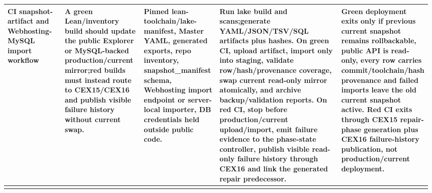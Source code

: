 \begin{longtable}{L{0.14\linewidth} L{0.19\linewidth} L{0.18\linewidth} L{0.31\linewidth} L{0.16\linewidth}}
\hline
\addlinespace[0.24em]
CI snapshot-artifact and Webhosting-MySQL import workflow & A green Lean/\allowbreak{}inventory build should update the public Explorer or MySQL-backed production/\allowbreak{}current mirror;\newline red builds must instead route to CEX15/\allowbreak{}CEX16 and publish visible failure history without current swap. & Pinned lean-toolchain/\allowbreak{}lake-manifest, Master YAML, generated exports, repo inventory, snapshot\_manifest schema, Webhosting import endpoint or server-local importer, DB credentials held outside public code. & Run lake build and scans;\newline generate YAML/\allowbreak{}JSON/\allowbreak{}TSV/\allowbreak{}SQL artifacts plus hashes. On green CI, upload artifact, import only into staging, validate row/\allowbreak{}hash/\allowbreak{}provenance coverage, swap current read-only mirror atomically, and archive backup/\allowbreak{}validation reports. On red CI, stop before production/\allowbreak{}current upload/\allowbreak{}import, emit failure evidence to the phase-state controller, publish visible read-only failure history through CEX16 and link the generated repair predecessor. & Green deployment exits only if previous current snapshot remains rollbackable, public API is read-only, every row carries commit/\allowbreak{}toolchain/\allowbreak{}hash provenance and failed imports leave the old current snapshot active. Red CI exits through CEX15 repair-phase generation plus CEX16 failure-history publication, not production/\allowbreak{}current deployment.\\
\hline
\addlinespace[0.24em]

\end{longtable}
